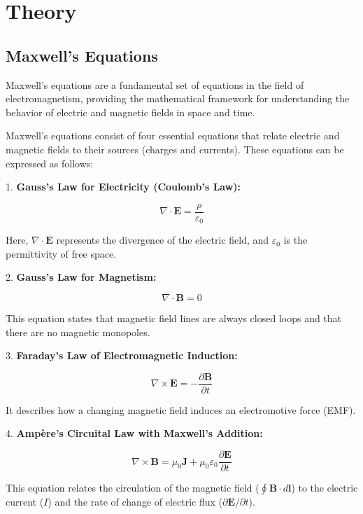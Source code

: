 \iffalse
\section{Theory}
\subsection{Maxwell's Equations}

Maxwell's equations are a fundamental set of equations in the field of electromagnetism, providing the mathematical framework for understanding the behavior of electric and magnetic fields in space and time.

Maxwell's equations consist of four essential equations that relate electric and magnetic fields to their sources (charges and currents). These equations can be expressed as follows:
\begin{center}
	1. \textbf{Gauss's Law for Electricity (Coulomb's Law):}
	
	\[
	\nabla \cdot \mathbf{E} = \frac{\rho}{\varepsilon_0}
	\]
	
	Here, \(\nabla \cdot \mathbf{E}\) represents the divergence of the electric field, and \(\varepsilon_0\) is the permittivity of free space.
\end{center}
\begin{center}
	2. \textbf{Gauss's Law for Magnetism:}
	
	\[
	\nabla \cdot \mathbf{B} = 0
	\]
	
	This equation states that magnetic field lines are always closed loops and that there are no magnetic monopoles.
\end{center}
\begin{center}
	3. \textbf{Faraday's Law of Electromagnetic Induction:}
	
	\[
	\nabla \times \mathbf{E} = -\frac{\partial \mathbf{B}}{\partial t}
	\]
	
	It describes how a changing magnetic field induces an electromotive force (EMF).
\end{center}
\begin{center}
	4. \textbf{Ampère's Circuital Law with Maxwell's Addition:}
	
	\[
	\nabla \times \mathbf{B} = \mu_0 \mathbf{J} + \mu_0 \varepsilon_0 \frac{\partial \mathbf{E}}{\partial t}
	\]
	
	This equation relates the circulation of the magnetic field (\(\oint \mathbf{B} \cdot d\mathbf{l}\)) to the electric current (\(I\)) and the rate of change of electric flux (\(\partial \mathbf{E}/\partial t\)). 
\end{center}


